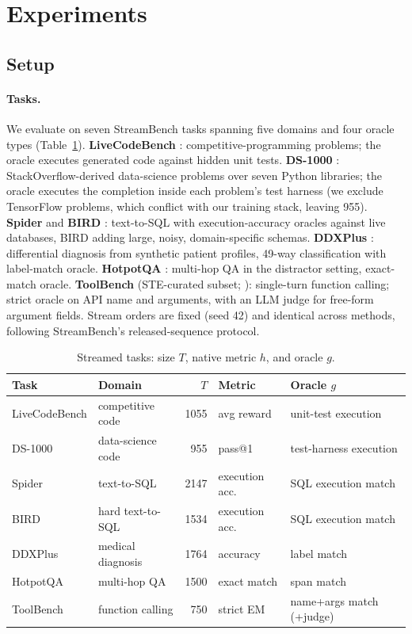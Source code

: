 \section{Experiments}
\label{sec:exp}

\subsection{Setup}
\label{sec:exp-setup}

\paragraph{Tasks.} We evaluate on seven StreamBench tasks spanning five domains
and four oracle types (Table~\ref{tab:datasets}). \textbf{LiveCodeBench}
\citep{jain2024livecodebench}: competitive-programming problems; the oracle
executes generated code against hidden unit tests. \textbf{DS-1000}
\citep{lai2023ds1000}: StackOverflow-derived data-science problems over seven
Python libraries; the oracle executes the completion inside each problem's test
harness (we exclude TensorFlow problems, which conflict with our training stack,
leaving 955). \textbf{Spider} \citep{yu2018spider} and \textbf{BIRD}
\citep{li2023bird}: text-to-SQL with execution-accuracy oracles against live
databases, BIRD adding large, noisy, domain-specific schemas. \textbf{DDXPlus}
\citep{fansi2022ddxplus}: differential diagnosis from synthetic patient profiles,
49-way classification with label-match oracle. \textbf{HotpotQA}
\citep{yang2018hotpotqa}: multi-hop QA in the distractor setting, exact-match
oracle. \textbf{ToolBench} (STE-curated subset; \citealp{wang2024ste}):
single-turn function calling; strict oracle on API name and arguments, with an
LLM judge for free-form argument fields. Stream orders are fixed
(seed 42) and identical across methods, following StreamBench's released-sequence
protocol.

\begin{table}[t]
\centering
\caption{Streamed tasks: size $T$, native metric $h$, and oracle $g$.}
\label{tab:datasets}
\small
\begin{tabular}{llrll}
\toprule
Task & Domain & $T$ & Metric & Oracle $g$ \\
\midrule
LiveCodeBench & competitive code & 1055 & avg reward & unit-test execution \\
DS-1000 & data-science code & 955 & pass@1 & test-harness execution \\
Spider & text-to-SQL & 2147 & execution acc. & SQL execution match \\
BIRD & hard text-to-SQL & 1534 & execution acc. & SQL execution match \\
DDXPlus & medical diagnosis & 1764 & accuracy & label match \\
HotpotQA & multi-hop QA & 1500 & exact match & span match \\
ToolBench & function calling & 750 & strict EM & name+args match (+judge) \\
\bottomrule
\end{tabular}
\end{table}

